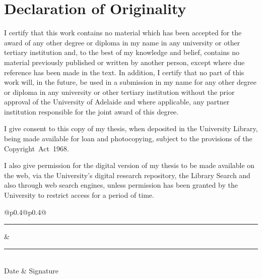 \cleardoublepage
\thispagestyle{empty}
\section*{Declaration of Originality}

I certify that this work contains no material which has been accepted for the award of any other degree or diploma in my name in any university or other tertiary institution and, to the best of my knowledge and belief, contains no material previously published or written by another person, except where due reference has been made in the text. 
In addition, I certify that no part of this work will, in the future, be used in a submission in my name for any other degree or diploma in any university or other tertiary institution without the prior approval of the University of Adelaide and where applicable, any partner institution responsible for the joint award of this degree.

I give consent to this copy of my thesis, when deposited in the University Library, being made available for loan and photocopying, subject to the provisions of the Copyright~Act~1968.

I also give permission for the digital version of my thesis to be made available on the web, via the University's digital research repository, the Library Search and also through web search engines, unless permission has been granted by the University to restrict access for a period of time.


\vspace*{1cm}\noindent
\begin{center}
\begin{tabular}{@{}p{0.4\textwidth}@{\hspace{0.15\textwidth}}p{0.4\textwidth}@{}}
\rule{\linewidth}{0.25pt}& \rule{\linewidth}{0.25pt}\\
Date & Signature
\end{tabular}
\end{center}